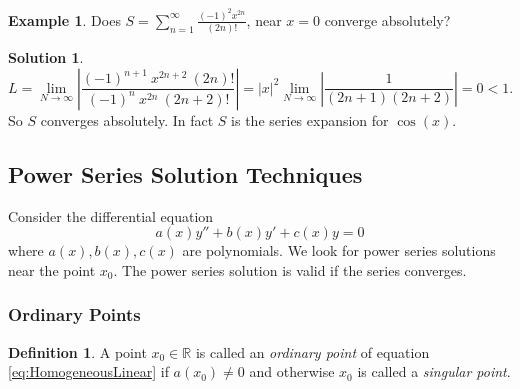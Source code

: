 \documentclass{article}
\theoremstyle{plain}
\theoremstyle{definition}
\newtheorem{definition}[thm]{Definition}
\newtheorem{exmp}{Example}[section]
\newtheorem*{sol}{Solution}
\numberwithin{equation}{section}
\begin{document}
\begin{tcolorbox}
    \begin{exmp}\label{exmp:PowerSeriesConvergence}
        Does $S = \sum_{n=1}^{\infty} \frac{(-1)^2 x^{2n}}{(2n)!}$, near $x=0$ converge absolutely?
    \end{exmp}
    \begin{sol}
        \[
        L = \lim_{N\to \infty} \left\vert \frac{(-1)^{n+1}\  x^{2n+2}\ (2n)!}{(-1)^n\ x^{2n}\ (2n+2)!} \right\vert 
        = \vert x \vert^2 \lim_{N \to \infty} \left\vert \frac{1}{(2n+1)(2n+2)} \right\vert = 0 < 1.
        \]
        So $S$ converges absolutely. In fact $S$ is the series expansion for $\cos(x)$.
    \end{sol}
\end{tcolorbox}

\subsection{Power Series Solution Techniques}

Consider the differential equation
\[
a(x)y'' + b(x)y' + c(x)y = 0
\]
where $a(x),b(x),c(x)$ are polynomials. We look for power series solutions near the point $x_0$. The power series solution is valid if the series converges.

\subsubsection{Ordinary Points}

\begin{definition}
    A point $x_0 \in \mathbb{R}$ is called an \textit{ordinary point} of equation \eqref{eq:HomogeneousLinear} if $a(x_0) \neq 0$ and otherwise $x_0$ is called a \textit{singular point}.
\end{definition}
\end{document}
